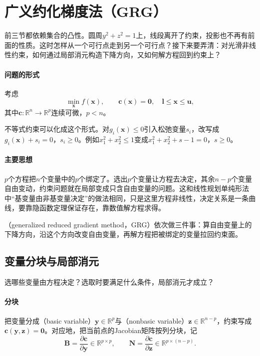 \section{广义约化梯度法（GRG）}
\label{sec:feas-grg}

前三节都依赖集合的凸性。圆周$y^2+z^2=1$上，线段离开了约束，投影也不再有前面的性质。这时怎样从一个可行点走到另一个可行点？接下来要弄清：对光滑非线性约束，如何通过局部消元构造下降方向，又如何解方程回到约束上？

\paragraph{问题的形式}
考虑
\begin{equation}
 \min_{\bm{x}}f(\bm{x}),\qquad \bm{c}(\bm{x})=\bm{0},\quad \bm{l}\leq\bm{x}\leq\bm{u},
 \label{eq:feas-grg-problem}
\end{equation}
其中$\bm{c}:\mathbb{R}^n\to\mathbb{R}^p$连续可微，$p<n$。

不等式约束可以化成这个形式。对$g_i(\bm{x})\leq0$引入松弛变量$s_i$，改写成$g_i(\bm{x})+s_i=0$，$s_i\geq0$。例如$x_1^2+x_2^2\leq1$变成$x_1^2+x_2^2+s-1=0$，$s\geq0$。

\paragraph{主要思想}
$p$个方程把$n$个变量中的$p$个绑定了。选出$p$个变量让方程去决定，其余$n-p$个变量自由变动，约束问题就在局部变成只含自由变量的问题。这和线性规划单纯形法中“基变量由非基变量决定”的做法相同，只是这里方程非线性，决定关系是一条曲线，要靠隐函数定理保证存在，靠数值解方程求得。

（generalized reduced gradient method，GRG）依次做三件事：算自由变量上的下降方向，沿这个方向改变自由变量，再解方程把被绑定的变量拉回约束面。

\subsection{变量分块与局部消元}
\label{sec:feas-grg-partition}

选哪些变量由方程决定？选取时要满足什么条件，局部消元才成立？

\paragraph{分块}
把变量分成（basic variable）$\bm{y}\in\mathbb{R}^{p}$与（nonbasic variable）$\bm{z}\in\mathbb{R}^{n-p}$，约束写成$\bm{c}(\bm{y},\bm{z})=\bm{0}$。对应地，把当前点的Jacobian矩阵按列分块，记
\begin{equation}
 \bm{B}=\frac{\partial\bm{c}}{\partial\bm{y}}\in\mathbb{R}^{p\times p},
 \qquad
 \bm{N}=\frac{\partial\bm{c}}{\partial\bm{z}}\in\mathbb{R}^{p\times(n-p)}.
 \label{eq:feas-grg-blocks}
\end{equation}


